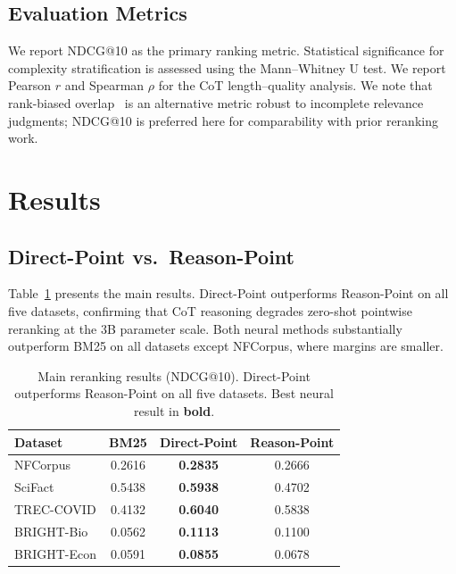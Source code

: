 \documentclass[sigconf,review]{acmart}
\begin{document}
\subsection{Evaluation Metrics}

We report NDCG@10 as the primary ranking metric. Statistical significance for complexity stratification is assessed using the Mann--Whitney U test. We report Pearson $r$ and Spearman $\rho$ for the CoT length--quality analysis. We note that rank-biased overlap~\cite{webber2010similarity} is an alternative metric robust to incomplete relevance judgments; NDCG@10 is preferred here for comparability with prior reranking work.

\section{Results}

\subsection{Direct-Point vs.\ Reason-Point}

Table~\ref{tab:main} presents the main results. Direct-Point outperforms Reason-Point on all five datasets, confirming that CoT reasoning degrades zero-shot pointwise reranking at the 3B parameter scale. Both neural methods substantially outperform BM25 on all datasets except NFCorpus, where margins are smaller.

\begin{table}[t]
\caption{Main reranking results (NDCG@10). Direct-Point outperforms Reason-Point on all five datasets. Best neural result in \textbf{bold}.}
\label{tab:main}
\centering
\small
\begin{tabular}{lccc}
\toprule
\textbf{Dataset} & \textbf{BM25} & \textbf{Direct-Point} & \textbf{Reason-Point} \\
\midrule
NFCorpus    & 0.2616 & \textbf{0.2835} & 0.2666 \\
SciFact     & 0.5438 & \textbf{0.5938} & 0.4702 \\
TREC-COVID  & 0.4132 & \textbf{0.6040} & 0.5838 \\
BRIGHT-Bio  & 0.0562 & \textbf{0.1113} & 0.1100 \\
BRIGHT-Econ & 0.0591 & \textbf{0.0855} & 0.0678 \\
\bottomrule
\end{tabular}
\end{table}
\end{document}
